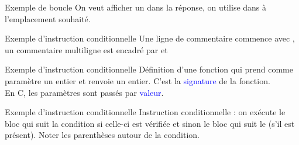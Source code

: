 \documentclass[10pt]{beamer}
\begin{document}
\begin{frame}{\Ctitle}{\stitle}
	\begin{exampleblock}{Exemple de boucle}
	\medskip
	On veut afficher un  dans la réponse, on utilise  dans  à l'emplacement souhaité.
	\end{exampleblock}
\end{frame}

\begin{frame}{\Ctitle}{\stitle}
	\begin{exampleblock}{Exemple d'instruction conditionnelle}
	\medskip
	Une ligne de commentaire commence avec \kw{//}, un commentaire multiligne est encadré par \kw{/*} et \kw{*/}
	\end{exampleblock}
\end{frame}

\begin{frame}{\Ctitle}{\stitle}
	\begin{exampleblock}{Exemple d'instruction conditionnelle}
	\medskip
	Définition d'une fonction  qui prend comme paramètre un entier et renvoie un entier. C'est la \textcolor{blue}{signature} de la fonction. \\
	\textcolor{BrickRed}{\important} En C, les paramètres sont passés par \textcolor{blue}{valeur}.
	\end{exampleblock}
\end{frame}

\begin{frame}{\Ctitle}{\stitle}
	\begin{exampleblock}{Exemple d'instruction conditionnelle}
	\medskip
	Instruction conditionnelle : on exécute le bloc qui suit la condition si celle-ci est vérifiée et sinon le bloc qui suit le  (s'il est présent).
	Noter les parenthèses autour de la condition.
	\end{exampleblock}
\end{frame}
\end{document}
